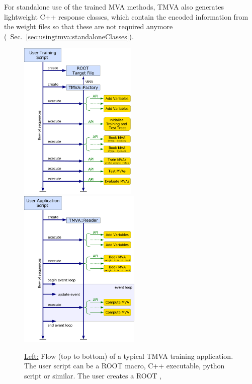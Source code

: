 For standalone use of the trained MVA methods, TMVA also generates lightweight 
C++ response classes, which contain the encoded information from the weight files
so that these are not required anymore (\cf\  Sec.~\ref{sec:usingtmva:standaloneClasses}).
\begin{figure}[p]
\begin{center}
   \includegraphics[width=0.50\textwidth]{plots/TMVAnalysisFlow}
   \hspace{-0.65cm}
   \includegraphics[width=0.516\textwidth]{plots/TMVAppFlow}
\end{center}
\vspace{-0.5cm}
\caption[.]{\underline{Left:} Flow (top to bottom) of a typical TMVA 
         training application.
         The user script can be a ROOT macro, C++ executable, python
         script or similar. The user creates a ROOT , 
}
\end{figure}
